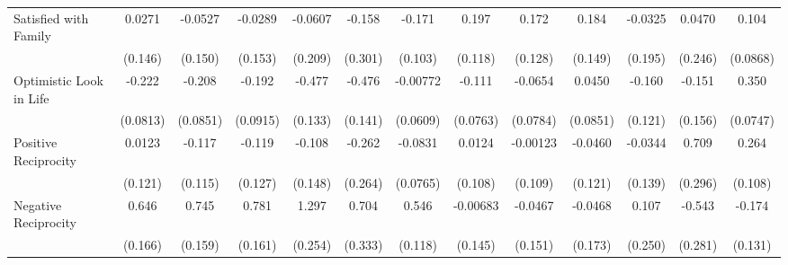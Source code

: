 {\begin{tabular}{l*{12}{c}}
\addlinespace
Satisfied with Family&      0.0271         &     -0.0527         &     -0.0289         &     -0.0607         &      -0.158         &      -0.171         &       0.197         &       0.172         &       0.184         &     -0.0325         &      0.0470         &       0.104         \\
            &     (0.146)         &     (0.150)         &     (0.153)         &     (0.209)         &     (0.301)         &     (0.103)         &     (0.118)         &     (0.128)         &     (0.149)         &     (0.195)         &     (0.246)         &    (0.0868)         \\
\addlinespace
Optimistic Look in Life&      -0.222\sym{**} &      -0.208\sym{*}  &      -0.192\sym{*}  &      -0.477\sym{***}&      -0.476\sym{***}&    -0.00772         &      -0.111         &     -0.0654         &      0.0450         &      -0.160         &      -0.151         &       0.350\sym{***}\\
            &    (0.0813)         &    (0.0851)         &    (0.0915)         &     (0.133)         &     (0.141)         &    (0.0609)         &    (0.0763)         &    (0.0784)         &    (0.0851)         &     (0.121)         &     (0.156)         &    (0.0747)         \\
\addlinespace
Positive Reciprocity&      0.0123         &      -0.117         &      -0.119         &      -0.108         &      -0.262         &     -0.0831         &      0.0124         &    -0.00123         &     -0.0460         &     -0.0344         &       0.709\sym{*}  &       0.264\sym{*}  \\
            &     (0.121)         &     (0.115)         &     (0.127)         &     (0.148)         &     (0.264)         &    (0.0765)         &     (0.108)         &     (0.109)         &     (0.121)         &     (0.139)         &     (0.296)         &     (0.108)         \\
\addlinespace
Negative Reciprocity&       0.646\sym{***}&       0.745\sym{***}&       0.781\sym{***}&       1.297\sym{***}&       0.704\sym{*}  &       0.546\sym{***}&    -0.00683         &     -0.0467         &     -0.0468         &       0.107         &      -0.543         &      -0.174         \\
            &     (0.166)         &     (0.159)         &     (0.161)         &     (0.254)         &     (0.333)         &     (0.118)         &     (0.145)         &     (0.151)         &     (0.173)         &     (0.250)         &     (0.281)         &     (0.131)         \\
\bottomrule
\end{tabular}
}
